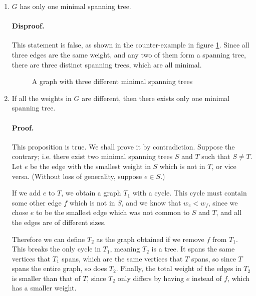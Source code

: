 \documentclass{article}
\begin{document}
\begin{enumerate}
	\item
		\(G\) has only one minimal spanning tree.

		\paragraph{Disproof.} This statement is false, as shown in the counter-example in figure \ref{q4a-counter}. Since all three edges are the same weight, and any two of them form a spanning tree, there are three distinct spanning trees, which are all minimal.
		\begin{figure}[htbp]
			\centering
			\caption{A graph with three different minimal spanning trees}
			\label{q4a-counter}
		\end{figure}

	\item
		If all the weights in \(G\) are different, then there exists only one minimal spanning tree.

		\paragraph{Proof.} This proposition is true. We shall prove it by contradiction. Suppose the contrary; i.e. there exist two minimal spanning trees \(S\) and \(T\) such that \(S \neq T\). Let \(e\) be the edge with the smallest weight in \(S\) which is not in \(T\), or vice versa. (Without loss of generality, suppose \(e \in S\).)

		If we add \(e\) to \(T\), we obtain a graph \(T_1\) with a cycle. This cycle must contain some other edge \(f\) which is not in \(S\), and we know that \(w_e < w_f\), since we chose \(e\) to be the smallest edge which was not common to \(S\) and \(T\), and all the edges are of different sizes.

		Therefore we can define \(T_2\) as the graph obtained if we remove \(f\) from \(T_1\). This breaks the only cycle in \(T_1\), meaning \(T_2\) is a tree. It spans the same vertices that \(T_1\) spans, which are the same vertices that \(T\) spans, so since \(T\) spans the entire graph, so does \(T_2\). Finally, the total weight of the edges in \(T_2\) is smaller than that of \(T\), since \(T_2\) only differs by having \(e\) instead of \(f\), which has a smaller weight.


\end{enumerate}
\end{document}
